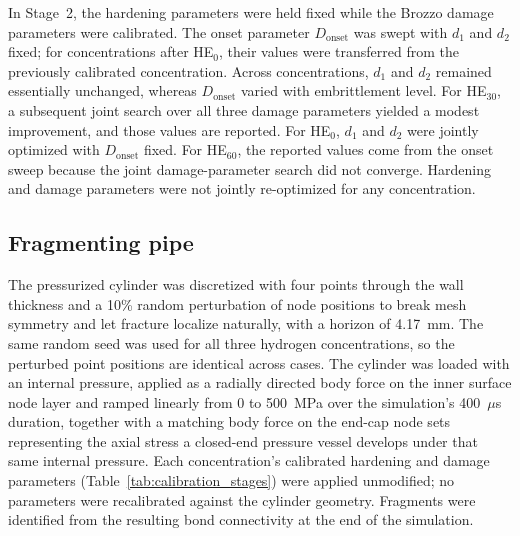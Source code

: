\documentclass[pdflatex,sn-mathphys-num]{sn-jnl}%
\theoremstyle{thmstyleone}%
\theoremstyle{thmstyletwo}%
\theoremstyle{thmstylethree}%
\begin{document}
In Stage~2, the hardening parameters were held fixed while the Brozzo damage parameters were calibrated. The onset parameter $D_\mathrm{onset}$ was swept with $d_1$ and $d_2$ fixed; for concentrations after HE$_{0}$, their values were transferred from the previously calibrated concentration. Across concentrations, $d_1$ and $d_2$ remained essentially unchanged, whereas $D_\mathrm{onset}$ varied with embrittlement level. For HE$_{30}$, a subsequent joint search over all three damage parameters yielded a modest improvement, and those values are reported. For HE$_{0}$, $d_1$ and $d_2$ were jointly optimized with $D_\mathrm{onset}$ fixed. For HE$_{60}$, the reported values come from the onset sweep because the joint damage-parameter search did not converge. Hardening and damage parameters were not jointly re-optimized for any concentration.

\subsection{Fragmenting pipe}\label{subsec2d}

The pressurized cylinder was discretized with four points through the wall thickness and a 10\%
random perturbation of node positions to break mesh symmetry and let fracture localize naturally,
with a horizon of 4.17~mm. The same random seed was used for all three hydrogen concentrations, so the perturbed point positions are identical across cases.
The cylinder was loaded with an internal pressure, applied as a radially directed body force on the
inner surface node layer and ramped linearly from 0 to 500~MPa over the simulation's 400~$\mu$s
duration, together with a matching body force on the end-cap node sets representing the axial stress
a closed-end pressure vessel develops under that same internal pressure. Each concentration's
calibrated hardening and damage parameters (Table~\ref{tab:calibration_stages}) were applied
unmodified; no parameters were recalibrated against the cylinder geometry. Fragments were identified
from the resulting bond connectivity at the end of the simulation.
\end{document}
